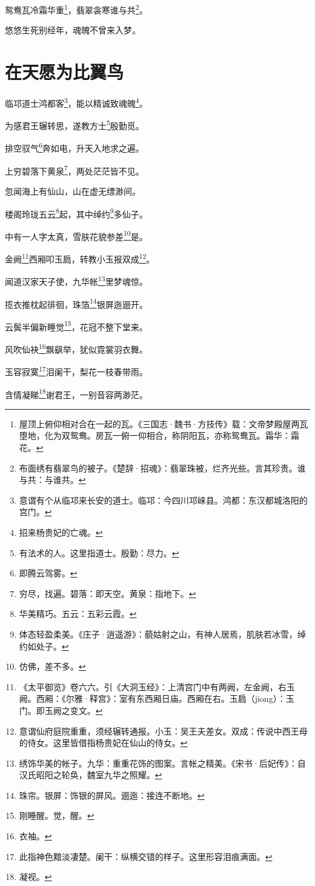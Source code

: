 \documentclass[UTF8]{ctexart}
\begin{document}
鸳鸯瓦冷霜华重\footnote{屋顶上俯仰相对合在一起的瓦。《三国志·魏书·方技传》载：文帝梦殿屋两瓦堕地，化为双鸳鸯。房瓦一俯一仰相合，称阴阳瓦，亦称鸳鸯瓦。霜华：霜花。}，翡翠衾寒谁与共\footnote{布面绣有翡翠鸟的被子。《楚辞·招魂》：翡翠珠被，烂齐光些。言其珍贵。谁与共：与谁共。}。

悠悠生死别经年，魂魄不曾来入梦。

\section{在天愿为比翼鸟}

临邛道士鸿都客\footnote{意谓有个从临邛来长安的道士。临邛：今四川邛崃县。鸿都：东汉都城洛阳的宫门。}，能以精诚致魂魄\footnote{招来杨贵妃的亡魂。}。

为感君王辗转思，遂教方士\footnote{有法术的人。这里指道士。殷勤：尽力。}殷勤觅。

排空驭气\footnote{即腾云驾雾。}奔如电，升天入地求之遍。

上穷碧落下黄泉\footnote{穷尽，找遍。碧落：即天空。黄泉：指地下。}，两处茫茫皆不见。

忽闻海上有仙山，山在虚无缥渺间。

楼阁玲珑五云\footnote{华美精巧。五云：五彩云霞。}起，其中绰约\footnote{体态轻盈柔美。《庄子·逍遥游》：藐姑射之山，有神人居焉，肌肤若冰雪，绰约如处子。}多仙子。

中有一人字太真，雪肤花貌参差\footnote{仿佛，差不多。}是。

金阙\footnote{《太平御览》卷六六。引《大洞玉经》：上清宫门中有两阙，左金阙，右玉阙。西厢：《尔雅·释宫》：室有东西厢日庙。西厢在右。玉扃（jiong）：玉门。即玉阙之变文。}西厢叩玉扃，转教小玉报双成\footnote{意谓仙府庭院重重，须经辗转通报。小玉：吴王夫差女。双成：传说中西王母的侍女。这里皆借指杨贵妃在仙山的侍女。}。

闻道汉家天子使，九华帐\footnote{绣饰华美的帐子。九华：重重花饰的图案。言帐之精美。《宋书·后妃传》：自汉氏昭阳之轮奂，魏室九华之照耀。}里梦魂惊。

揽衣推枕起徘徊，珠箔\footnote{珠帘。银屏：饰银的屏风。逦迤：接连不断地。}银屏迤逦开。

云鬓半偏新睡觉\footnote{刚睡醒。觉，醒。}，花冠不整下堂来。

风吹仙袂\footnote{衣袖。}飘飖举，犹似霓裳羽衣舞。

玉容寂寞\footnote{此指神色黯淡凄楚。阑干：纵横交错的样子。这里形容泪痕满面。}泪阑干，梨花一枝春带雨。

含情凝睇\footnote{凝视。}谢君王，一别音容两渺茫。
\end{document}
